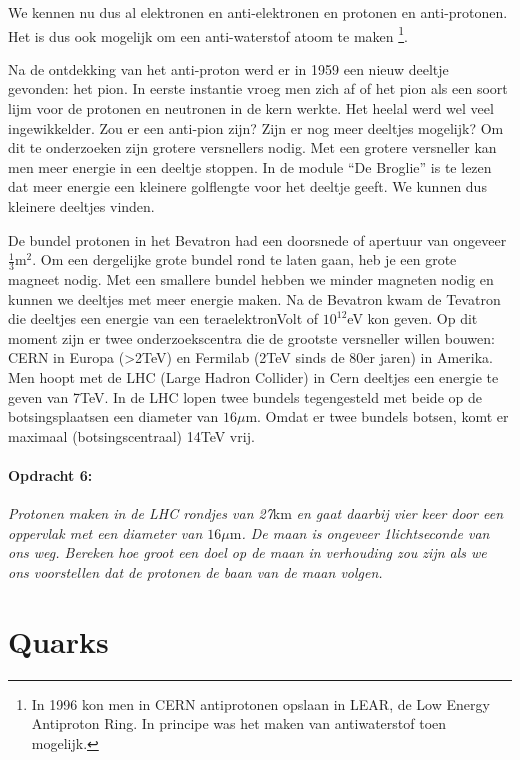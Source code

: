 We kennen nu dus al elektronen en anti-elektronen en protonen en
anti-protonen. Het is dus ook mogelijk om een anti-waterstof atoom te
maken \footnote{In 1996 kon men in CERN antiprotonen opslaan in LEAR, de
Low Energy Antiproton Ring. In principe was het maken van antiwaterstof
toen mogelijk.}. 

Na de ontdekking van het anti-proton werd er in 1959 een nieuw deeltje
gevonden: het pion. In eerste instantie vroeg men zich af of het pion
als een soort lijm voor de protonen en neutronen in de kern werkte.
Het heelal werd wel veel ingewikkelder. Zou er een anti-pion zijn?
Zijn er nog meer deeltjes mogelijk? Om dit te onderzoeken zijn grotere
versnellers nodig. Met een grotere versneller kan men meer energie
in een deeltje stoppen. In de module ``De Broglie'' is te lezen
dat meer energie een kleinere golflengte voor het deeltje geeft. We
kunnen dus kleinere deeltjes vinden.

De bundel protonen in het Bevatron had een doorsnede of apertuur van
ongeveer $\frac{1}{3}\mathrm{m}^{2}$. Om een dergelijke grote bundel
rond te laten gaan, heb je een grote magneet nodig. Met een smallere
bundel hebben we minder magneten nodig en kunnen we deeltjes met meer
energie maken. Na de Bevatron kwam de Tevatron die deeltjes een energie
van een teraelektronVolt of $10^{12}$eV kon geven. Op dit moment
zijn er twee onderzoekscentra die de grootste versneller willen bouwen:
CERN in Europa (>2TeV) en Fermilab (2TeV sinds de 80er jaren) in Amerika.
Men hoopt met de LHC (Large Hadron Collider) in Cern deeltjes een
energie te geven van 7TeV. In de LHC lopen twee bundels tegengesteld
met beide op de botsingsplaatsen een diameter van $16\mu\mathrm{m}$.
Omdat er twee bundels botsen, komt er maximaal (botsingscentraal)
14TeV vrij.


\paragraph*{Opdracht 6:}

\emph{Protonen maken in de LHC rondjes van 27}km\emph{ en gaat daarbij
vier keer door een oppervlak met een diameter van $16\mu\mathrm{m}$.
De maan is ongeveer 1lichtseconde van ons weg. Bereken hoe groot een
doel op de maan in verhouding zou zijn als we ons voorstellen dat
de protonen de baan van de maan volgen. }


\section{Quarks}

